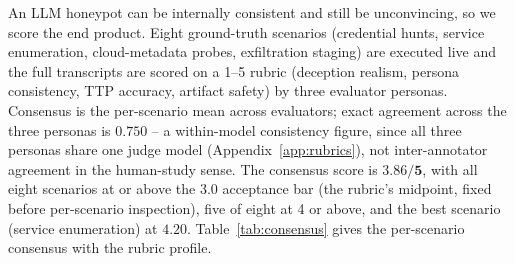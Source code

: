 An LLM honeypot can be internally consistent and still be unconvincing,
so we score the end product. Eight ground-truth scenarios (credential
hunts, service enumeration, cloud-metadata probes, exfiltration staging)
are executed live and the full transcripts are scored on a 1--5 rubric
(deception realism, persona consistency, TTP accuracy, artifact safety)
by three evaluator personas. Consensus is the per-scenario mean across
evaluators; exact agreement across the three personas is $0.750$ -- a
within-model consistency figure, since all three personas share one
judge model (Appendix~\ref{app:rubrics}), not inter-annotator agreement
in the human-study sense. The consensus score is
$\mathbf{3.86/5}$, with all eight scenarios at or above the $3.0$ acceptance bar (the
rubric's midpoint, fixed before per-scenario inspection), five of eight
at 4 or above, and the best scenario (service enumeration) at $4.20$.
Table~\ref{tab:consensus} gives the per-scenario consensus with the
rubric profile.

\begin{table}[t]
\centering
\caption{Per-scenario consensus (mean of three evaluator personas over
the 1--5 rubric). The rubric profile of the weakest scenario locates the
weakness in persona realism and artifact safety, not in the deception's
technique accuracy.}
\label{tab:consensus}
\small
\setlength{\tabcolsep}{3.5pt}
\end{table}

